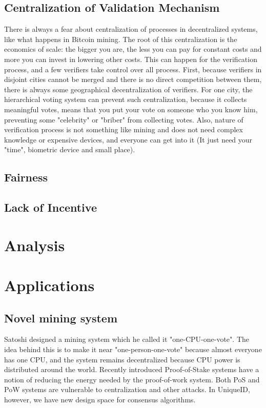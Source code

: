 \documentclass[conference]{IEEEtran}
\begin{document}
\subsection{Centralization of Validation Mechanism}
There is always a fear about centralization of processes in decentralized systems, like what happens in Bitcoin mining. The root of this centralization is the economics of scale: the bigger you are, the less you can pay for constant costs and more you can invest in lowering other costs. This can happen for the verification process, and a few verifiers take control over all process. First, because verifiers in disjoint cities cannot be merged and there is no direct competition between them, there is always some geographical decentralization of verifiers. For one city, the hierarchical voting system can prevent such centralization, because it collects meaningful votes, means that you put your vote on someone who you know him, preventing some "celebrity" or "briber" from collecting votes. Also, nature of verification process is not something like mining and does not need complex knowledge or expensive devices, and everyone can get into it (It just need your "time", biometric device and small place). 

\subsection{Fairness}
\subsection{Lack of Incentive}


\section{Analysis}

 
\section{Applications}

\subsection{Novel mining system}
Satoshi designed a mining system which he called it "one-CPU-one-vote". The idea behind this is to make it near "one-person-one-vote" because almost everyone has one CPU, and the system remains decentralized because CPU power is distributed around the world. Recently introduced Proof-of-Stake systems have a notion of reducing the energy needed by the proof-of-work system. Both PoS and PoW systems are vulnerable to centralization and other attacks. In UniqueID, however, we have new design space for consensus algorithms.
\end{document}
